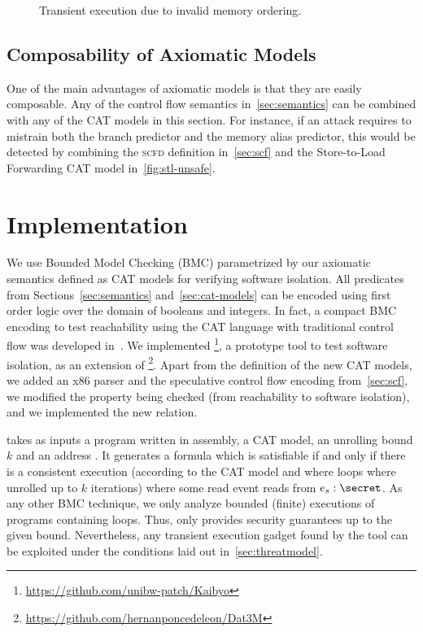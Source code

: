\documentclass[conference]{IEEEtran}
\begin{document}
\begin{figure}[t]
\centering
\scalebox{.8}{}
\caption{Transient execution due to invalid memory ordering.}
\label{fig:concurrency}
\end{figure}

\subsection{Composability of Axiomatic Models}
\label{sec:composability}

One of the main advantages of axiomatic models is that they are easily composable.
Any of the control flow semantics in~\autoref{sec:semantics} can be combined with any of the CAT models in this section.
For instance, if an attack requires to mistrain both the branch predictor and the memory alias predictor, this would be detected by combining the \textsc{scfd} definition in~\autoref{sec:scf} and the Store-to-Load Forwarding CAT model in~\autoref{fig:stl-unsafe}.

\newcommand\usedtimeout{90 }

\section{Implementation}
\label{sec:framework}

We use Bounded Model Checking (BMC) parametrized by our axiomatic semantics defined as CAT models for verifying software isolation. 
%
All predicates from Sections~\ref{sec:semantics} and~\ref{sec:cat-models} can be encoded using first order logic over the domain of booleans and integers.
In fact, a compact BMC encoding to test reachability using the CAT language with traditional control flow was developed in~\cite{porthos,dartagnan-cav}.
We implemented \zombmc\footnote{\url{https://github.com/unibw-patch/Kaibyo}}, a prototype tool to test software isolation, as an extension of \dartagnan\footnote{\url{https://github.com/hernanponcedeleon/Dat3M}}.
Apart from the definition of the new CAT models, we added an x86 parser and the speculative control flow encoding from~\autoref{sec:scf}, we modified the property being checked (from reachability to software isolation), and we implemented the new  relation.

\zombmc takes as inputs a program written in \xes assembly, a CAT model, an unrolling bound $k$ and an address \secret.
It generates a formula which is satisfiable if and only if there is a consistent execution (according to the CAT model and where loops where unrolled up to $k$ iterations) where some read event reads from $e_s: \secret$.
As any other BMC technique, we only analyze bounded (finite) executions of programs containing loops.
Thus, \zombmc only provides security guarantees up to the given bound.
Nevertheless, any transient execution gadget found by the tool can be exploited under the conditions laid out in~\autoref{sec:threatmodel}.
\end{document}
